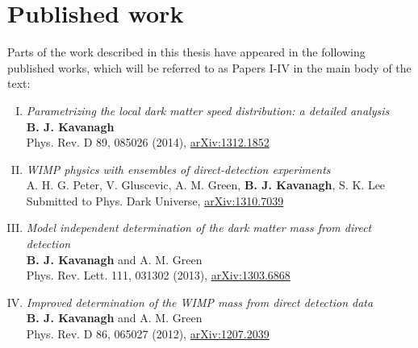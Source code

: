 \chapter*{Published work}

Parts of the work described in this thesis have appeared in the following published works, which will be referred to as Papers I-IV in the main body of the text:

\begin{SingleSpace}

  \begin{enumerate}[I.]
    \item \textit{Parametrizing the local dark matter speed distribution: a detailed analysis}\\
    \textbf{B. J. Kavanagh}\\
    Phys. Rev. D 89, 085026 (2014), \href{http://arxiv.org/abs/1312.1852}{arXiv:1312.1852}

    \item \textit{WIMP physics with ensembles of direct-detection experiments}\\
    A. H. G. Peter, V. Gluscevic, A. M. Green, \textbf{B. J. Kavanagh}, S. K. Lee\\
    Submitted to Phys. Dark Universe, \href{http://arxiv.org/abs/1310.7039}{arXiv:1310.7039}

    \item \textit{Model independent determination of the dark matter mass from direct detection}\\
    \textbf{B. J. Kavanagh} and A. M. Green\\
    Phys. Rev. Lett. 111, 031302 (2013), \href{http://arxiv.org/abs/1303.6868}{arXiv:1303.6868}

    \item \textit{Improved determination of the WIMP mass from direct detection data}\\
    \textbf{B. J. Kavanagh} and A. M. Green \\
    Phys. Rev. D 86, 065027 (2012), \href{http://arxiv.org/abs/1207.2039}{arXiv:1207.2039}
  \end{enumerate}

\end{SingleSpace}



